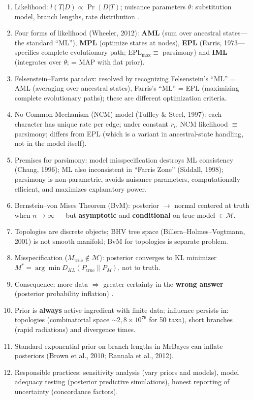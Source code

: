 \clearpage
\begin{revise}\small
\begin{enumerate}[itemsep=0pt, topsep=0pt, parsep=0pt]
    \item Likelihood: $l(T|D) \propto \Pr(D|T)$; nuisance parameters $\theta$: substitution model, branch lengths, rate distribution \parencite{edwards1972,wheeler2012}.
    \item Four forms of likelihood (Wheeler, 2012): \textbf{AML} (sum over ancestral states---the standard ``ML''), \textbf{MPL} (optimize states at nodes), \textbf{EPL} (Farris, 1973---specifies complete evolutionary path; $\text{EPL}_{\max} \equiv$ parsimony) and \textbf{IML} (integrates over $\theta$; = MAP with flat prior).
    \item Felsenstein--Farris paradox: resolved by recognizing Felsenstein's ``ML'' = AML (averaging over ancestral states), Farris's ``ML'' = EPL (maximizing complete evolutionary paths); these are different optimization criteria.
    \item No-Common-Mechanism (NCM) model (Tuffley \& Steel, 1997): each character has unique rate per edge; under constant $r_i$, NCM likelihood $\equiv$ parsimony; differs from EPL (which is a variant in ancestral-state handling, not in the model itself).
    \item Premises for parsimony: model misspecification destroys ML consistency (Chang, 1996); ML also inconsistent in ``Farris Zone'' (Siddall, 1998); parsimony is non-parametric, avoids nuisance parameters, computationally efficient, and maximizes explanatory power.
    \item Bernstein--von Mises Theorem (BvM): posterior $\to$ normal centered at truth when $n\to\infty$ --- but \textbf{asymptotic} and \textbf{conditional} on true model $\in \mathcal{M}$.
    \item Topologies are discrete objects; BHV tree space (Billera--Holmes--Vogtmann, 2001) is not smooth manifold; BvM for topologies is separate problem.
    \item Misspecification ($M_{\text{true}} \notin \mathcal{M}$): posterior converges to KL minimizer $M^* = \arg\min D_{KL}(P_{\text{true}} \| P_M)$, not to truth.
    \item Consequence: more data $\Rightarrow$ greater certainty in the \textbf{wrong answer} (posterior probability inflation) \parencite{suzuki2002,kumar2012}.
    \item Prior is \textbf{always} active ingredient with finite data; influence persists in: topologies (combinatorial space $\sim 2{,}8\times 10^{76}$ for 50 taxa), short branches (rapid radiations) and divergence times.
    \item Standard exponential prior on branch lengths in MrBayes can inflate posteriors (Brown et al., 2010; Rannala et al., 2012).
    \item Responsible practices: sensitivity analysis (vary priors and models), model adequacy testing (posterior predictive simulations), honest reporting of uncertainty (concordance factors).
\end{enumerate}
\end{revise}

\clearpage

\printbibliography[heading=subbibliography,title={References}]

